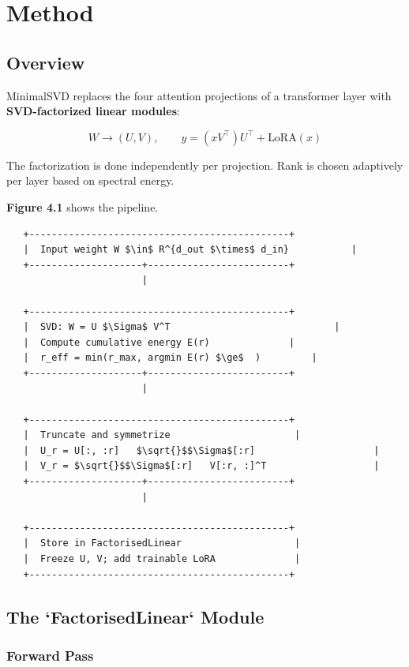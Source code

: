 
\section{Method}

\subsection{Overview}

MinimalSVD replaces the four attention projections of a transformer layer 
with \textbf{SVD-factorized linear modules}:

\[
W \to (U, V), \qquad
y = (x V^\top) U^\top + \text{LoRA}(x)
\tag{4.1}
\]

The factorization is done independently per projection. Rank is chosen 
adaptively per layer based on spectral energy.

\textbf{Figure 4.1} shows the pipeline.

\begin{lstlisting}
   +----------------------------------------------+
   |  Input weight W $\in$ R^{d_out $\times$ d_in}           |
   +--------------------+-------------------------+
                        |
                         
   +----------------------------------------------+
   |  SVD: W = U $\Sigma$ V^T                             |
   |  Compute cumulative energy E(r)              |
   |  r_eff = min(r_max, argmin E(r) $\ge$  )         |
   +--------------------+-------------------------+
                        |
                         
   +----------------------------------------------+
   |  Truncate and symmetrize                      |
   |  U_r = U[:, :r]   $\sqrt{}$$\Sigma$[:r]                     |
   |  V_r = $\sqrt{}$$\Sigma$[:r]   V[:r, :]^T                   |
   +--------------------+-------------------------+
                        |
                         
   +----------------------------------------------+
   |  Store in FactorisedLinear                    |
   |  Freeze U, V; add trainable LoRA              |
   +----------------------------------------------+
\end{lstlisting}

\subsection{The `FactorisedLinear` Module}

\subsubsection{Forward Pass}

